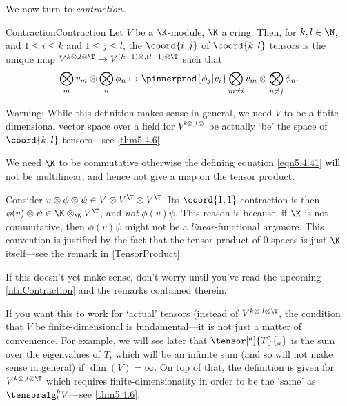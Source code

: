 We now turn to \emph{contraction}.
\begin{dfn}{Contraction}{Contraction}
	Let $V$ be a $\K$-module, $\K$ a cring.  Then, for $k,l\in \N$, and $1\leq i\leq k$ and $1\leq j\leq l$, the $\coord{i,j}$  of $\coord{k,l}$ tensors is the unique map $V^{k\otimes ,l\otimes \T}\rightarrow V^{(k-1)\otimes ,(l-1)\otimes \T}$ such that
	\begin{equation}\label{eqn5.4.41}
		\bigotimes _mv_m\otimes \bigotimes _{n}\phi _n\mapsto \pinnerprod{\phi _j|v_i}\bigotimes _{m\neq i}v_m\otimes \bigotimes _{n\neq j}\phi _n.
	\end{equation}
	\begin{rmk}
		Warning:  While this definition makes sense in general, we need $V$ to be a finite-dimensional vector space over a field for $V^{k\otimes ,l\otimes}$ be actually `be' the space of $\coord{k,l}$ tensors---see \cref{thm5.4.6}.
	\end{rmk}
	\begin{rmk}
		We need $\K$ to be commutative otherwise the defining equation \eqref{eqn5.4.41} will not be multilinear, and hence not give a map on the tensor product.
	\end{rmk}
	\begin{rmk}
		Consider $v\otimes \phi \otimes \psi \in V\otimes V^{\T}\otimes V^{\T}$.  Its $\coord{1,1}$ contraction is then $\phi (v)\otimes \psi \in \K \otimes _{\K}V^{\T}$, and \emph{not} $\phi (v)\psi$.  This reason is because, if $\K$ is not commutative, then $\phi (v)\psi$ might not be a \emph{linear}-functional anymore.  This convention is justified by the fact that the tensor product of $0$ spaces is just $\K$ itself---see the remark in \cref{TensorProduct}.
	\end{rmk}
	\begin{rmk}
		If this doesn't yet make sense, don't worry until you've read the upcoming \cref{ntnContraction} and the remarks contained therein.
	\end{rmk}
	\begin{rmk}
		If you want this to work for `actual' tensors (instead of $V^{k\otimes ,l\otimes \T}$, the condition that $V$ be finite-dimensional is fundamental---it is not just a matter of convenience.  For example, we will see later that $\tensor[^a]{T}{_a}$ is the sum over the eigenvalues of $T$, which will be an infinite sum (and so will not make sense in general) if $\dim (V)=\infty$.  On top of that, the definition is given for $V^{k\otimes ,l\otimes \T}$ which requires finite-dimensionality in order to be the `same' as $\tensoralg _l^kV$---see \cref{thm5.4.6}.
	\end{rmk}
\end{dfn}
